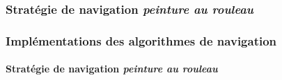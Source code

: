 \documentclass{beamer}
\begin{document}
			\subsubsection*{Stratégie de navigation \textit{peinture au rouleau}}
				\begin{frame}
					\frametitle{Implémentations des algorithmes de navigation}
					\framesubtitle{Stratégie de navigation \textit{peinture au rouleau}}
					\begin{figure}[H]
						\centering
					\end{figure}
				\end{frame}
\end{document}
